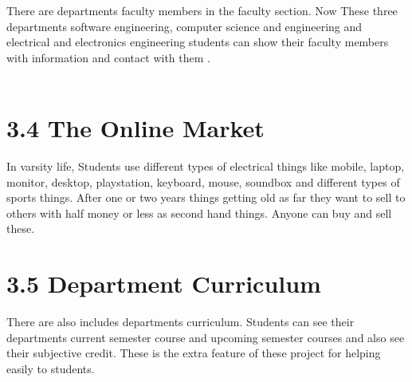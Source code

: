 \documentclass{standalone}
\begin{document}
There are departments faculty members in the faculty section. Now These three departments software engineering, computer science and engineering and electrical and electronics engineering students can show their faculty members with information and contact with them .\\\\[1.4cm]

\section*{3.4\hspace{0.3 cm} The Online Market}
 \vspace{0.3cm}


In varsity life, Students use different types of electrical things like mobile, laptop, monitor, desktop, playstation, keyboard, mouse, soundbox and different types of sports things. After one or two years things getting old as far they want to sell to others with half money or less as second hand things. Anyone can buy and sell these.\\[1.1cm]

\section*{3.5\hspace{0.3 cm} Department Curriculum}
 \vspace{0.3cm}

There are also includes departments curriculum. Students can see their departments current semester course and upcoming semester courses and also see their subjective credit. These is the extra feature of these project for helping easily to students.\\\\
\end{document}
